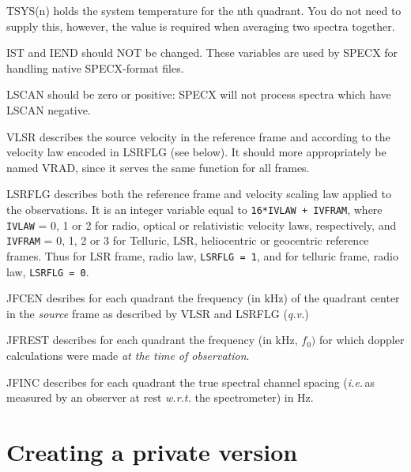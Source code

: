 \documentclass[11pt,twoside]{report}
\newcommand{\ie}{{\it i.e.\,}}
\begin{document}
\begin{description}
\item {} TSYS(n) holds the system temperature for the nth quadrant.
        You do not need to supply this, however,
        the value is required when averaging two spectra
        together.

\item {} IST and IEND should NOT be changed. These variables are used
         by SPECX for handling native SPECX-format files.

\item {} LSCAN should be zero or positive: SPECX will not process spectra
         which have LSCAN negative.

\item {} VLSR describes the source velocity in the reference frame and
         according to the velocity law encoded in LSRFLG (see below). It
         should more appropriately be named VRAD, since it serves the same
         function for all frames.

\item {} LSRFLG describes both the reference frame and velocity scaling law
         applied to the observations. It is an integer variable equal to
         \verb$16*IVLAW + IVFRAM$, where \verb+IVLAW+ = 0, 1 or 2 for
         radio, optical or relativistic velocity laws, respectively, and
         \verb+IVFRAM+ = 0, 1, 2 or 3 for Telluric, LSR, heliocentric
         or geocentric reference frames. Thus for LSR frame, radio law,
         \verb+LSRFLG = 1+, and for telluric frame, radio law,
         \verb+LSRFLG = 0+.

\item {} JFCEN desribes for each quadrant the frequency (in kHz) of the
         quadrant center in the {\em source} frame as described by VLSR
         and LSRFLG ({\em q.v.})

\item {} JFREST describes for each quadrant the frequency (in kHz, $f_0)$ for which
         doppler calculations were made {\em at the time of observation}.

\item {} JFINC describes for each quadrant the true spectral channel spacing
         (\ie as measured by an observer at rest {\em w.r.t.} the spectrometer)
         in Hz.

\end{description}

\newpage
\chapter{Creating a private version} 
\end{document}

